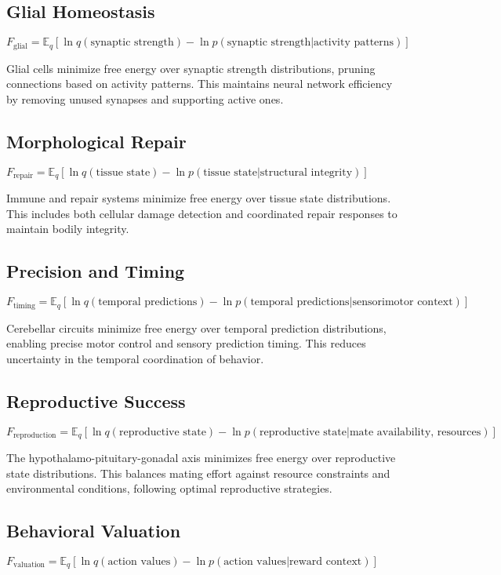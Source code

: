 \documentclass[10pt]{article}
\begin{document}
\subsection{Glial Homeostasis}
$F_{\text{glial}} = \mathbb{E}_q[\ln q(\text{synaptic strength}) - \ln p(\text{synaptic strength}|\text{activity patterns})]$

Glial cells minimize free energy over synaptic strength distributions, pruning connections based on activity patterns. This maintains neural network efficiency by removing unused synapses and supporting active ones.

\subsection{Morphological Repair}
$F_{\text{repair}} = \mathbb{E}_q[\ln q(\text{tissue state}) - \ln p(\text{tissue state}|\text{structural integrity})]$

Immune and repair systems minimize free energy over tissue state distributions. This includes both cellular damage detection and coordinated repair responses to maintain bodily integrity.

\subsection{Precision and Timing}
$F_{\text{timing}} = \mathbb{E}_q[\ln q(\text{temporal predictions}) - \ln p(\text{temporal predictions}|\text{sensorimotor context})]$

Cerebellar circuits minimize free energy over temporal prediction distributions, enabling precise motor control and sensory prediction timing. This reduces uncertainty in the temporal coordination of behavior.

\subsection{Reproductive Success}
$F_{\text{reproduction}} = \mathbb{E}_q[\ln q(\text{reproductive state}) - \ln p(\text{reproductive state}|\text{mate availability, resources})]$

The hypothalamo-pituitary-gonadal axis minimizes free energy over reproductive state distributions. This balances mating effort against resource constraints and environmental conditions, following optimal reproductive strategies.

\subsection{Behavioral Valuation}
$F_{\text{valuation}} = \mathbb{E}_q[\ln q(\text{action values}) - \ln p(\text{action values}|\text{reward context})]$
\end{document}
